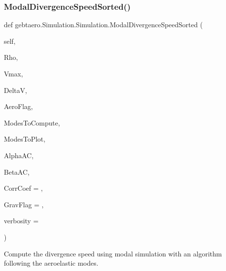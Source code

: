\subsubsection{\texorpdfstring{Modal\+Divergence\+Speed\+Sorted()}{ModalDivergenceSpeedSorted()}}
{\footnotesize\ttfamily def gebtaero.\+Simulation.\+Simulation.\+Modal\+Divergence\+Speed\+Sorted (\begin{DoxyParamCaption}\item[{}]{self,  }\item[{}]{Rho,  }\item[{}]{Vmax,  }\item[{}]{DeltaV,  }\item[{}]{Aero\+Flag,  }\item[{}]{Modes\+To\+Compute,  }\item[{}]{Modes\+To\+Plot,  }\item[{}]{Alpha\+AC,  }\item[{}]{Beta\+AC,  }\item[{}]{Corr\+Coef = {},  }\item[{}]{Grav\+Flag = {},  }\item[{}]{verbosity = {} }\end{DoxyParamCaption})}



Compute the divergence speed using modal simulation with an algorithm following the aeroelastic modes. 


